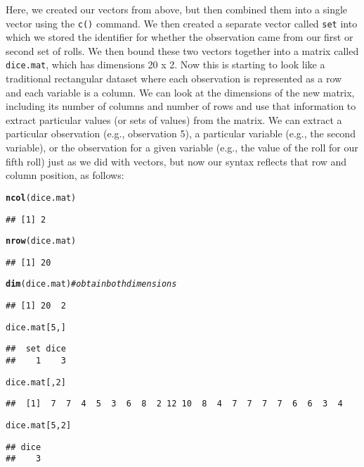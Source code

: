 \documentclass[12pt]{article}\usepackage[]{graphicx}\usepackage[]{color}
\makeatletter
\newcommand{\hlnum}[1]{\textcolor[rgb]{0.686,0.059,0.569}{#1}}%
\newcommand{\hlcom}[1]{\textcolor[rgb]{0.678,0.584,0.686}{\textit{#1}}}%
\newcommand{\hlstd}[1]{\textcolor[rgb]{0.345,0.345,0.345}{#1}}%
\newcommand{\hlkwd}[1]{\textcolor[rgb]{0.737,0.353,0.396}{\textbf{#1}}}%
\newenvironment{kframe}{%
 \def\at@end@of@kframe{}%
 \ifinner\ifhmode%
  \def\at@end@of@kframe{\end{minipage}}%
  \begin{minipage}{\columnwidth}%
 \fi\fi%
 \def\FrameCommand##1{\hskip\@totalleftmargin \hskip-\fboxsep
 \colorbox{shadecolor}{##1}\hskip-\fboxsep
     \hskip-\linewidth \hskip-\@totalleftmargin \hskip\columnwidth}%
 \MakeFramed {\advance\hsize-\width
   \@totalleftmargin\z@ \linewidth\hsize
   \@setminipage}}%
 {\par\unskip\endMakeFramed%
 \at@end@of@kframe}
\newenvironment{knitrout}{}{} %
\makeatother
\begin{document}
Here, we created our vectors from above, but then combined them into a single vector using the \verb|c()| command. We then created a separate vector called \verb|set| into which we stored the identifier for whether the observation came from our first or second set of rolls. We then bound these two vectors together into a matrix called \verb|dice.mat|, which has dimensions 20 x 2. Now this is starting to look like a traditional rectangular dataset where each observation is represented as a row and each variable is a column. We can look at the dimensions of the new matrix, including its number of columns and number of rows and use that information to extract particular values (or sets of values) from the matrix. We can extract a particular observation (e.g., observation 5), a particular variable (e.g., the second variable), or the observation for a given variable (e.g., the value of the roll for our fifth roll) just as we did with vectors, but now our syntax reflects that row and column position, as follows:
\begin{knitrout}
\color{fgcolor}\begin{kframe}
\begin{alltt}
\hlkwd{ncol}\hlstd{(dice.mat)}
\end{alltt}
\begin{verbatim}
## [1] 2
\end{verbatim}
\begin{alltt}
\hlkwd{nrow}\hlstd{(dice.mat)}
\end{alltt}
\begin{verbatim}
## [1] 20
\end{verbatim}
\begin{alltt}
\hlkwd{dim}\hlstd{(dice.mat)}  \hlcom{#obtain both dimensions}
\end{alltt}
\begin{verbatim}
## [1] 20  2
\end{verbatim}
\begin{alltt}
\hlstd{dice.mat[}\hlnum{5}\hlstd{, ]}
\end{alltt}
\begin{verbatim}
##  set dice 
##    1    3
\end{verbatim}
\begin{alltt}
\hlstd{dice.mat[,} \hlnum{2}\hlstd{]}
\end{alltt}
\begin{verbatim}
##  [1]  7  7  4  5  3  6  8  2 12 10  8  4  7  7  7  7  6  6  3  4
\end{verbatim}
\begin{alltt}
\hlstd{dice.mat[}\hlnum{5}\hlstd{,} \hlnum{2}\hlstd{]}
\end{alltt}
\begin{verbatim}
## dice 
##    3
\end{verbatim}
\end{kframe}
\end{knitrout}
\end{document}
